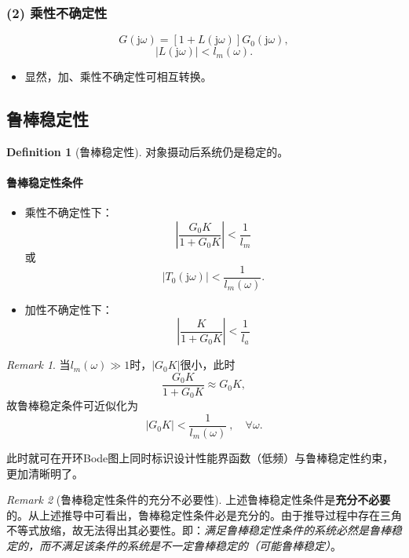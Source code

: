 \documentclass[14pt,a4paper]{article}
\theoremstyle{plain}
\theoremstyle{definition}
\newtheorem*{dfn}{Definition}
\theoremstyle{remark}
\newtheorem{rmk}{Remark}[section]
\theoremstyle{plain}
\theoremstyle{plain}
\theoremstyle{definition}
\begin{document}
				\subsubsection*{(2) 乘性不确定性}%
					\[
						G(\mathrm{j} \omega ) =\left[ 1+L(\mathrm{j} \omega ) \right]  G_0(\mathrm{j} \omega ) 
					,\] 
					\[
						\left| L(\mathrm{j} \omega ) \right| < l_{m}(\omega )
					.\] 
	
				\begin{itemize}
					\item 显然，加、乘性不确定性可相互转换。
				\end{itemize}  

		\subsection{鲁棒稳定性}%
		\label{sub:鲁棒稳定性}

			\begin{dfn}[鲁棒稳定性]  
			\label{dfn:鲁棒稳定性}
				对象摄动后系统仍是稳定的。
			\end{dfn} 
		
			\paragraph{鲁棒稳定性条件}%
			\label{par:鲁棒稳定性条件}
			
				\begin{itemize}
					\item 乘性不确定性下：
						\[
							\left| \dfrac{G_0 K}{1+G_0 K} \right| < \dfrac{1}{l_{m}}
						\] 
						或
						\[
							\left| T_0(\mathrm{j} \omega ) \right| < \dfrac{1}{l_{m}(\omega )}
						.\] 
					\item 加性不确定性下：
						\[
							\left| \dfrac{K}{1+G_0 K} \right| < \dfrac{1}{l_{a}}
						\] 
				\end{itemize}  
			
				\begin{rmk}  
				当$l_{m}(\omega )\gg 1$时，$|G_0K|$很小，此时
				\[
					\dfrac{G_0K}{1+G_0K} \approx G_0 K
				,\] 
				故鲁棒稳定条件可近似化为
				\[
					\left| G_0 K \right| < \dfrac{1}{l_{m}(\omega )} \ ,\quad \forall \omega 
				.\] 

				此时就可在开环Bode图上同时标识设计性能界函数（低频）与鲁棒稳定性约束，更加清晰明了。
				\end{rmk} 

				\begin{rmk}[鲁棒稳定性条件的充分不必要性]  
				\label{rmk:鲁棒稳定性条件的充分不必要性}
				上述鲁棒稳定性条件是\textbf{充分不必要}的。从上述推导中可看出，鲁棒稳定性条件必是充分的。由于推导过程中存在三角不等式放缩，故无法得出其必要性。即：\emph{满足鲁棒稳定性条件的系统必然是鲁棒稳定的，而不满足该条件的系统是不一定鲁棒稳定的（可能鲁棒稳定）}。
				\end{rmk} 
\end{document}
